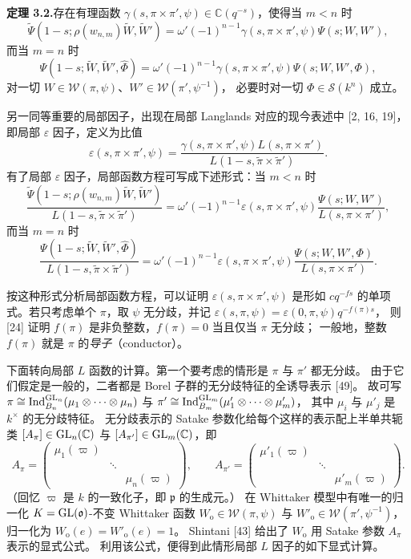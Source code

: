 \textbf{定理 3.2.}\quad 存在有理函数
$\gamma(s,\pi\times\pi',\psi)\in\mathbb{C}(q^{-s})$，使得当 $m<n$ 时
\[
\widetilde{\Psi}(1-s;\rho(w_{n,m})\widetilde{W},\widetilde{W}')
=\omega'(-1)^{n-1}\gamma(s,\pi\times\pi',\psi)\Psi(s;W,W'),
\]
而当 $m=n$ 时
\[
\Psi(1-s;\widetilde{W},\widetilde{W}',\widehat{\Phi})
=\omega'(-1)^{n-1}\gamma(s,\pi\times\pi',\psi)\Psi(s;W,W',\Phi),
\]
对一切 $W\in\mathcal{W}(\pi,\psi)$、$W'\in\mathcal{W}(\pi',\psi^{-1})$，
必要时对一切 $\Phi\in\mathcal{S}(k^n)$ 成立。

另一同等重要的局部因子，出现在局部 Langlands 对应的现今表述中 [2, 16, 19]，
即局部 $\varepsilon$ 因子，定义为比值
\[
\varepsilon(s,\pi\times\pi',\psi)
=\frac{\gamma(s,\pi\times\pi',\psi)L(s,\pi\times\pi')}
{L(1-s,\widetilde{\pi}\times\widetilde{\pi}')}.
\]
有了局部 $\varepsilon$ 因子，局部函数方程可写成下述形式：当 $m<n$ 时
\[
\frac{\widetilde{\Psi}(1-s;\rho(w_{n,m})\widetilde{W},\widetilde{W}')}
{L(1-s,\widetilde{\pi}\times\widetilde{\pi}')}
=\omega'(-1)^{n-1}\varepsilon(s,\pi\times\pi',\psi)
\frac{\Psi(s;W,W')}{L(s,\pi\times\pi')},
\]
而当 $m=n$ 时
\[
\frac{\Psi(1-s;\widetilde{W},\widetilde{W}',\widehat{\Phi})}
{L(1-s,\widetilde{\pi}\times\widetilde{\pi}')}
=\omega'(-1)^{n-1}\varepsilon(s,\pi\times\pi',\psi)
\frac{\Psi(s;W,W',\Phi)}{L(s,\pi\times\pi')}.
\]

按这种形式分析局部函数方程，可以证明 $\varepsilon(s,\pi\times\pi',\psi)$
是形如 $cq^{-fs}$ 的单项式。若只考虑单个 $\pi$，取 $\psi$ 无分歧，并记
$\varepsilon(s,\pi,\psi)=\varepsilon(0,\pi,\psi)q^{-f(\pi)s}$，
则 [24] 证明 $f(\pi)$ 是非负整数，$f(\pi)=0$ 当且仅当 $\pi$ 无分歧；
一般地，整数 $f(\pi)$ 就是 $\pi$ 的\emph{导子}（conductor）。

下面转向局部 $L$ 函数的计算。第一个要考虑的情形是 $\pi$ 与 $\pi'$ 都无分歧。
由于它们假定是一般的，二者都是 Borel 子群的无分歧特征的全诱导表示 [49]。
故可写 $\pi\cong\operatorname{Ind}_{B_n}^{\mathrm{GL}_n}(\mu_1\otimes\cdots\otimes\mu_n)$ 与
$\pi'\cong\operatorname{Ind}_{B_m}^{\mathrm{GL}_m}(\mu'_1\otimes\cdots\otimes\mu'_m)$，
其中 $\mu_i$ 与 $\mu'_j$ 是 $k^\times$ 的无分歧特征。
无分歧表示的 Satake 参数化给每个这样的表示配上半单共轭类
$[A_\pi]\in\mathrm{GL}_n(\mathbb{C})$ 与 $[A_{\pi'}]\in\mathrm{GL}_m(\mathbb{C})$，即
\[
A_\pi=\begin{pmatrix}\mu_1(\varpi)&&\\&\ddots&\\&&\mu_n(\varpi)\end{pmatrix},
\qquad
A_{\pi'}=\begin{pmatrix}\mu'_1(\varpi)&&\\&\ddots&\\&&\mu'_m(\varpi)\end{pmatrix}.
\]
（回忆 $\varpi$ 是 $k$ 的一致化子，即 $\mathfrak{p}$ 的生成元。）
在 Whittaker 模型中有唯一的归一化 $K=\mathrm{GL}(\mathfrak{o})$-不变 Whittaker 函数
$W_{\mathrm{o}}\in\mathcal{W}(\pi,\psi)$ 与
$W'_{\mathrm{o}}\in\mathcal{W}(\pi',\psi^{-1})$，归一化为
$W_{\mathrm{o}}(e)=W'_{\mathrm{o}}(e)=1$。
Shintani [43] 给出了 $W_{\mathrm{o}}$ 用 Satake 参数 $A_\pi$ 表示的显式公式。
利用该公式，便得到此情形局部 $L$ 因子的如下显式计算。

